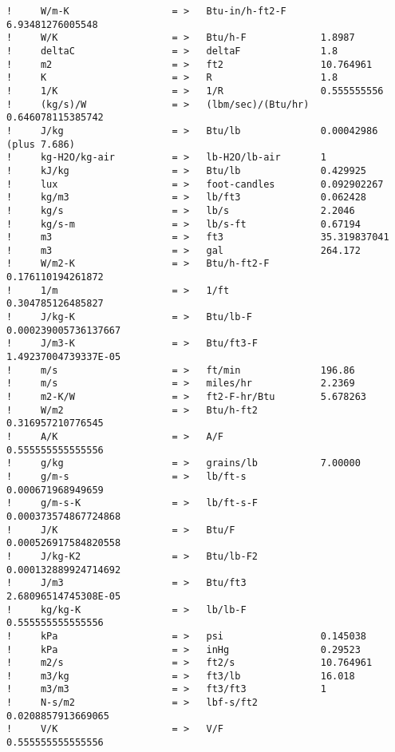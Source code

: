 \begin{lstlisting}
!     W/m-K                  = >   Btu-in/h-ft2-F      6.93481276005548
!     W/K                    = >   Btu/h-F             1.8987
!     deltaC                 = >   deltaF              1.8
!     m2                     = >   ft2                 10.764961
!     K                      = >   R                   1.8
!     1/K                    = >   1/R                 0.555555556
!     (kg/s)/W               = >   (lbm/sec)/(Btu/hr)  0.646078115385742
!     J/kg                   = >   Btu/lb              0.00042986 (plus 7.686)
!     kg-H2O/kg-air          = >   lb-H2O/lb-air       1
!     kJ/kg                  = >   Btu/lb              0.429925
!     lux                    = >   foot-candles        0.092902267
!     kg/m3                  = >   lb/ft3              0.062428
!     kg/s                   = >   lb/s                2.2046
!     kg/s-m                 = >   lb/s-ft             0.67194
!     m3                     = >   ft3                 35.319837041
!     m3                     = >   gal                 264.172
!     W/m2-K                 = >   Btu/h-ft2-F         0.176110194261872
!     1/m                    = >   1/ft                0.304785126485827
!     J/kg-K                 = >   Btu/lb-F            0.000239005736137667
!     J/m3-K                 = >   Btu/ft3-F           1.49237004739337E-05
!     m/s                    = >   ft/min              196.86
!     m/s                    = >   miles/hr            2.2369
!     m2-K/W                 = >   ft2-F-hr/Btu        5.678263
!     W/m2                   = >   Btu/h-ft2           0.316957210776545
!     A/K                    = >   A/F                 0.555555555555556
!     g/kg                   = >   grains/lb           7.00000
!     g/m-s                  = >   lb/ft-s             0.000671968949659
!     g/m-s-K                = >   lb/ft-s-F           0.000373574867724868
!     J/K                    = >   Btu/F               0.000526917584820558
!     J/kg-K2                = >   Btu/lb-F2           0.000132889924714692
!     J/m3                   = >   Btu/ft3             2.68096514745308E-05
!     kg/kg-K                = >   lb/lb-F             0.555555555555556
!     kPa                    = >   psi                 0.145038
!     kPa                    = >   inHg                0.29523
!     m2/s                   = >   ft2/s               10.764961
!     m3/kg                  = >   ft3/lb              16.018
!     m3/m3                  = >   ft3/ft3             1
!     N-s/m2                 = >   lbf-s/ft2           0.0208857913669065
!     V/K                    = >   V/F                 0.555555555555556

\end{lstlisting}
